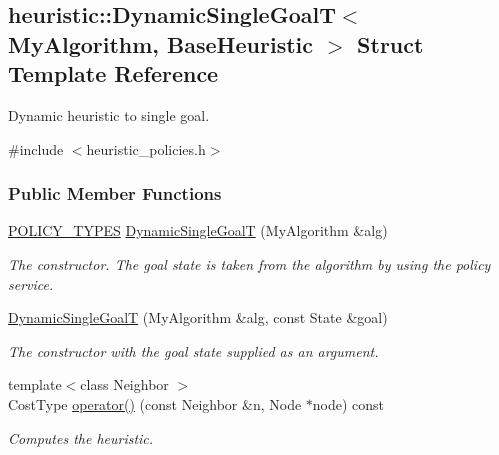 \hypertarget{structheuristic_1_1DynamicSingleGoalT}{}\subsection{heuristic\+:\+:Dynamic\+Single\+GoalT$<$ My\+Algorithm, Base\+Heuristic $>$ Struct Template Reference}
\label{structheuristic_1_1DynamicSingleGoalT}


Dynamic heuristic to single goal.  




{\ttfamily \#include $<$heuristic\+\_\+policies.\+h$>$}

\subsubsection*{Public Member Functions}
\begin{DoxyCompactItemize}
\item 
\hyperlink{extensions_2shared__policies_2headers_8h_ae70a06fa4631780beea14971eb36a562}{P\+O\+L\+I\+C\+Y\+\_\+\+T\+Y\+P\+ES} \hyperlink{structheuristic_1_1DynamicSingleGoalT_ac926b0d41bcc79b2d9eb319b47b46c96}{Dynamic\+Single\+GoalT} (My\+Algorithm \&alg)
\begin{DoxyCompactList}\small\item\em The constructor. The goal state is taken from the algorithm by using the policy service. \end{DoxyCompactList}\item 
\hyperlink{structheuristic_1_1DynamicSingleGoalT_a56e9713b26cec27c2304901814d27204}{Dynamic\+Single\+GoalT} (My\+Algorithm \&alg, const State \&goal)
\begin{DoxyCompactList}\small\item\em The constructor with the goal state supplied as an argument. \end{DoxyCompactList}\item 
{\footnotesize template$<$class Neighbor $>$ }\\Cost\+Type \hyperlink{structheuristic_1_1DynamicSingleGoalT_afb9e9caeb53ad512788437e596256b7d}{operator()} (const Neighbor \&n, Node $\ast$node) const 
\begin{DoxyCompactList}\small\item\em Computes the heuristic. \end{DoxyCompactList}\end{DoxyCompactItemize}
